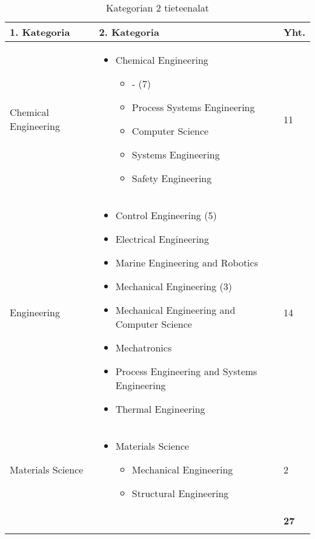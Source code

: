 \documentclass[utf8]{gradu3}
\begin{document}
\begin{longtable}[h]{|p{5cm}|p{8cm}|p{1cm}|}
    \hline
        \textbf{1. Kategoria}    & \textbf{2. Kategoria} & \textbf{Yht.} \\
        \hline
        Chemical Engineering    & 
        \begin{itemize}[nosep]
            \item Chemical Engineering 
            \begin{itemize}[nosep]
                \item - (7)
                \item Process Systems Engineering
                \item Computer Science 
                \item Systems Engineering
                \item Safety Engineering
            \end{itemize}
        \end{itemize} & 11 \\
        \hline
        Engineering & 
        \begin{itemize}[nosep]
            \item Control Engineering (5)
            \item Electrical Engineering
            \item Marine Engineering and Robotics
            \item Mechanical Engineering (3)
            \item Mechanical Engineering and Computer Science
            \item Mechatronics
            \item Process Engineering and Systems Engineering
            \item Thermal Engineering
        \end{itemize} & 14 \\
        \hline
        Materials Science & 
        \begin{itemize}[nosep]
            \item Materials Science
            \begin{itemize}[nosep]
                \item Mechanical Engineering
                \item Structural Engineering
            \end{itemize}
        \end{itemize} & 2 \\
    \hline
        &   & \textbf{27} \\
    \hline
    \caption{Kategorian 2 tieteenalat}
    \label{table:Kategorian 2. tieteenalat}
\end{longtable}
\end{document}
